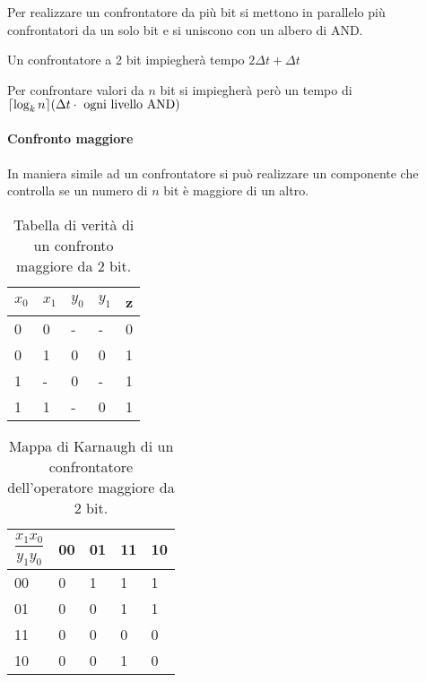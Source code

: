 
Per realizzare un confrontatore da più bit si mettono in parallelo più confrontatori da un solo bit e si uniscono con un albero di AND.


Un confrontatore a 2 bit impiegherà tempo $ 2\Delta t + \Delta t $

Per confrontare valori da $ n $ bit si impiegherà però un tempo di $ \lceil\log_kn\rceil(\Delta t \cdot \text{ ogni livello AND})$

\paragraph{Confronto maggiore}
In maniera simile ad un confrontatore si può realizzare un componente che controlla se un numero di $ n $ bit è maggiore di un altro.

\begin{table}[H]
	\centering
	\caption{Tabella di verità di un confronto maggiore da 2 bit.}
	\label{tab:2bitgreater}
	\begin{tabular}{|ll|ll|l|}
		\hline
		$ x_0 $ & $ x_1 $ & $ y_0 $ & $ y_1 $ & z \\ \hline
		0       & 0       & -       & -       & 0 \\
		0       & 1       & 0       & 0       & 1 \\
		1       & -       & 0       & -       & 1 \\
		1       & 1       & -       & 0       & 1 \\ \hline
	\end{tabular}
\end{table}

\begin{table}[H]
	\centering
	\caption{Mappa di Karnaugh di un confrontatore dell'operatore maggiore da 2 bit.}
	\label{tab:2bitgreater}
	\begin{tabular}{|l|llll|}
		\hline
		$ \dfrac{x_1x_0}{y_1y_0} $ & 00 & 01 & 11                        & 10                        \\ \hline
		00                         & 0  & 1  & \cellcolor[HTML]{FFCCC9}1 & \cellcolor[HTML]{FFCCC9}1 \\
		01                         & 0  & 0  & \cellcolor[HTML]{FFCCC9}1 & \cellcolor[HTML]{FFCCC9}1 \\
		11                         & 0  & 0  & 0                         & 0                         \\
		10                         & 0  & 0  & 1                         & 0                         \\ \hline
	\end{tabular}
\end{table}

